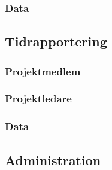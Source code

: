 \documentclass[a4paper]{article}
\begin{document}
\subsubsection{Data}








\subsection{Tidrapportering}

\subsubsection{Projektmedlem}

\subsubsection{Projektledare}

\subsubsection{Data}








\subsection{Administration}
\end{document}
